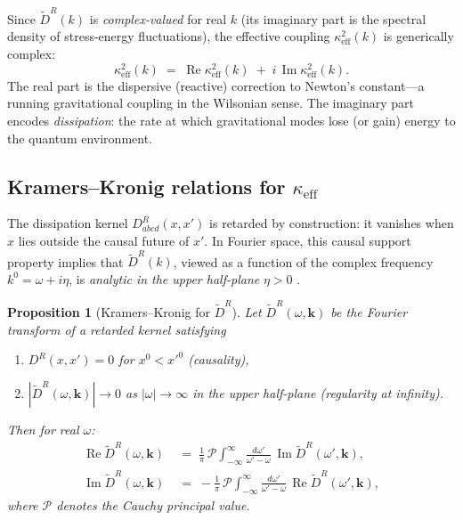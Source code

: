 \documentclass[12pt,a4paper]{article}
\newtheorem{proposition}[theorem]{Proposition}
\begin{document}
Since $\tilde{D}^{R}(k)$ is \emph{complex-valued} for real $k$ (its imaginary part is the spectral density of stress-energy fluctuations), the effective coupling $\kappa_{\mathrm{eff}}^{2}(k)$ is generically complex:
\begin{equation}\label{eq:keffdecomp}
  \kappa_{\mathrm{eff}}^{2}(k) \;=\;
  \operatorname{Re}\kappa_{\mathrm{eff}}^{2}(k)
  \;+\;
  i\,\operatorname{Im}\kappa_{\mathrm{eff}}^{2}(k).
\end{equation}
The real part is the dispersive (reactive) correction to Newton's constant---a running gravitational coupling in the Wilsonian sense.
The imaginary part encodes \emph{dissipation}: the rate at which gravitational modes lose (or gain) energy to the quantum environment.

\subsection{Kramers--Kronig relations for $\kappa_{\mathrm{eff}}$}\label{sec:KK}

The dissipation kernel $D^{R}_{abcd}(x,x')$ is retarded by construction: it vanishes when $x$ lies outside the causal future of $x'$.
In Fourier space, this causal support property implies that $\tilde{D}^{R}(k)$, viewed as a function of the complex frequency $k^{0}=\omega+i\eta$, is \emph{analytic in the upper half-plane} $\eta>0$ \cite{KramersKronig,KKproof}.

\begin{proposition}[Kramers--Kronig for $\tilde{D}^{R}$]\label{prop:KKDR}
Let $\tilde{D}^{R}(\omega,\mathbf{k})$ be the Fourier transform of a retarded kernel satisfying
\begin{enumerate}
  \item[(i)] $D^{R}(x,x')=0$ for $x^{0}<x'^{0}$ \textup{(causality)},
  \item[(ii)] $|\tilde{D}^{R}(\omega,\mathbf{k})|\to 0$ as $|\omega|\to\infty$ in the upper half-plane \textup{(regularity at infinity)}.
\end{enumerate}
Then for real $\omega$:
\begin{align}
  \operatorname{Re}\tilde{D}^{R}(\omega,\mathbf{k})
  &\;=\;
  \frac{1}{\pi}\,\mathcal{P}\!\!\int_{-\infty}^{\infty}\frac{d\omega'}{\omega'-\omega}\,
  \operatorname{Im}\tilde{D}^{R}(\omega',\mathbf{k}), \label{eq:KK1}\\[6pt]
  \operatorname{Im}\tilde{D}^{R}(\omega,\mathbf{k})
  &\;=\;
  -\frac{1}{\pi}\,\mathcal{P}\!\!\int_{-\infty}^{\infty}\frac{d\omega'}{\omega'-\omega}\,
  \operatorname{Re}\tilde{D}^{R}(\omega',\mathbf{k}), \label{eq:KK2}
\end{align}
where $\mathcal{P}$ denotes the Cauchy principal value.
\end{proposition}
\end{document}
